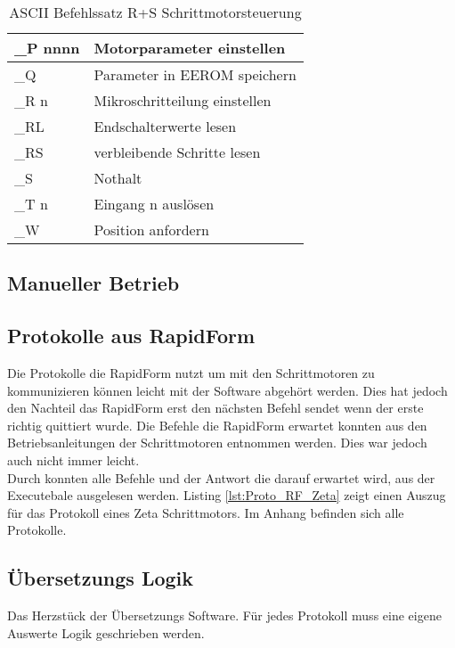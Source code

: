 \begin{table}[htb]
\begin{tabular}{|l|l|}
\rule[-1ex]{0pt}{2.5ex} \_P nnnn 	& Motorparameter einstellen                    \\ \hline 
\rule[-1ex]{0pt}{2.5ex} \_Q 		& Parameter in EEROM speichern                 \\ \hline 
\rule[-1ex]{0pt}{2.5ex} \_R n 		& Mikroschritteilung einstellen                \\ \hline 
\rule[-1ex]{0pt}{2.5ex} \_RL 		& Endschalterwerte lesen                       \\ \hline 
\rule[-1ex]{0pt}{2.5ex} \_RS  		& verbleibende Schritte lesen                  \\ \hline 
\rule[-1ex]{0pt}{2.5ex} \_S   		& Nothalt                                      \\ \hline 
\rule[-1ex]{0pt}{2.5ex} \_T n 		& Eingang n auslösen                           \\ \hline 
\rule[-1ex]{0pt}{2.5ex} \_W   		& Position anfordern                           \\ \hline 
\end{tabular} 
\caption{ASCII Befehlssatz R+S Schrittmotorsteuerung}\cite{rs:ug_stepper}
\label{tbl:ASCII_RS}
\end{table}
\subsection{Manueller Betrieb}
\subsection{Protokolle aus RapidForm}
Die Protokolle die RapidForm nutzt um mit den Schrittmotoren zu kommunizieren können leicht mit der Software  abgehört werden. Dies hat jedoch den Nachteil das RapidForm erst den nächsten Befehl sendet wenn der erste richtig quittiert wurde. Die Befehle die RapidForm erwartet konnten aus den Betriebsanleitungen der Schrittmotoren entnommen werden. Dies war jedoch auch nicht immer leicht.\\
Durch  konnten alle Befehle und der Antwort die darauf erwartet wird, aus der Executebale ausgelesen werden. Listing \ref{lst:Proto_RF_Zeta} zeigt einen Auszug für das Protokoll eines Zeta Schrittmotors. Im Anhang befinden sich alle Protokolle.
\lstset{language=C, basicstyle=\footnotesize, showstringspaces=false, tabsize=8}

\subsection{Übersetzungs Logik}
Das Herzstück der Übersetzungs Software. Für jedes Protokoll muss eine eigene Auswerte Logik geschrieben werden. 
